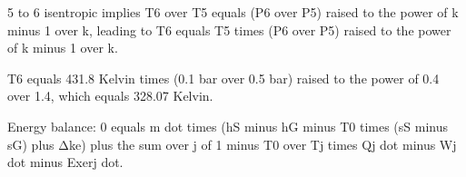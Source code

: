 5 to 6 isentropic implies T6 over T5 equals (P6 over P5) raised to the power of k minus 1 over k, leading to T6 equals T5 times (P6 over P5) raised to the power of k minus 1 over k. 

T6 equals 431.8 Kelvin times (0.1 bar over 0.5 bar) raised to the power of 0.4 over 1.4, which equals 328.07 Kelvin.

Energy balance: 0 equals m dot times (hS minus hG minus T0 times (sS minus sG) plus Δke) plus the sum over j of 1 minus T0 over Tj times Qj dot minus Wj dot minus Exerj dot.